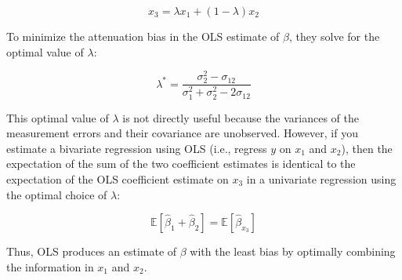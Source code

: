 \[
x_3 = \lambda x_1 + (1 - \lambda) x_2
\]

To minimize the attenuation bias in the OLS estimate of \(\beta\), they solve for the optimal value of \(\lambda\):

\[
\lambda^* = \frac{\sigma_2^2 - \sigma_{12}}{\sigma_1^2 + \sigma_2^2 - 2\sigma_{12}}
\]

This optimal value of \(\lambda\) is not directly useful because the variances of the measurement errors and their covariance are unobserved. However, if you estimate a bivariate regression using OLS (i.e., regress \(y\) on \(x_1\) and \(x_2\)), then the expectation of the sum of the two coefficient estimates is identical to the expectation of the OLS coefficient estimate on \(x_3\) in a univariate regression using the optimal choice of \(\lambda\):

\[
\mathbb{E} \left[ \hat{\beta}_1 + \hat{\beta}_2 \right] = \mathbb{E} \left[ \hat{\beta}_{x_3} \right]
\]

Thus, OLS produces an estimate of \(\beta\) with the least bias by optimally combining the information in \(x_1\) and \(x_2\).
